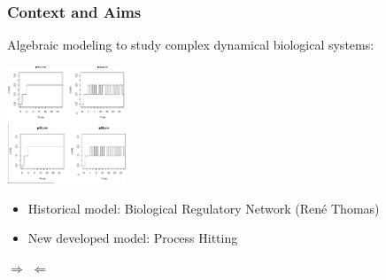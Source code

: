
\begin{frame}[c]
  \frametitle{Context and Aims}

Algebraic modeling to study complex dynamical biological systems:

\begin{center}
  \includegraphics[scale=1.5, height=3.5cm]{figs/testsimulation1.png}
\end{center}



\pause
\begin{itemize}
  \item Historical model: Biological Regulatory Network (René Thomas)
  \item New developed model: Process Hitting
\end{itemize}

\textcolor{couleurtheme}{$\Rightarrow$}  \textcolor{couleurtheme}{$\Leftarrow$}

\end{frame}
